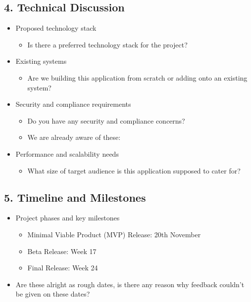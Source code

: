 \documentclass[11pt,a4paper]{article}
\begin{document}
\vspace{2em}

\subsection*{4. Technical Discussion \hfill}
\begin{itemize}[leftmargin=*]
    \item Proposed technology stack
    \begin{itemize}
        \item Is there a preferred technology stack for the project?
    \end{itemize}
    \item Existing systems
    \begin{itemize}
        \item Are we building this application from scratch or adding onto an existing system?
    \end{itemize}
    \item Security and compliance requirements
    \begin{itemize}
        \item Do you have any security and compliance concerns?
        \item We are already aware of these:
    \end{itemize}
    \item Performance and scalability needs
    \begin{itemize}
        \item What size of target audience is this application supposed to cater for?
    \end{itemize}
\end{itemize}

\vspace{2em}

\subsection*{5. Timeline and Milestones \hfill}
\begin{itemize}[leftmargin=*]
    \item Project phases and key milestones
    \begin{itemize}
        \item Minimal Viable Product (MVP) Release: 20th November
        \item Beta Release: Week 17
        \item Final Release: Week 24
    \end{itemize}
    \item Are these alright as rough dates, is there any reason why feedback couldn't be given on these dates?
\end{itemize}
\end{document}

